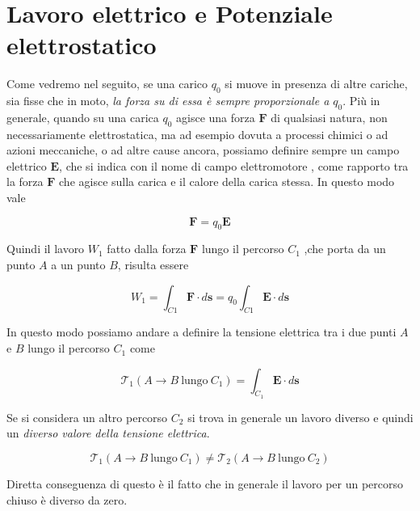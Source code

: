\chapter{Lavoro elettrico e Potenziale elettrostatico}

Come vedremo nel seguito, se una carico $q_0$ si muove in presenza di altre cariche, sia fisse che in moto, \emph{la forza su di essa è sempre proporzionale a $q_0$}. Più in generale, quando su una carica $q_0$ agisce una forza $\mathbf{F}$ di qualsiasi natura, non necessariamente elettrostatica, ma ad esempio dovuta a processi chimici o ad azioni meccaniche, o ad altre cause ancora, possiamo definire sempre un campo elettrico $\mathbf{E}$, che si indica con il nome di campo elettromotore , come rapporto tra la forza $\mathbf{F}$ che agisce sulla carica e il calore della carica stessa. In questo modo vale 

\begin{equation*}
    \mathbf{F} = q_0 \mathbf{E}
\end{equation*}

Quindi il lavoro $W_1$ fatto dalla forza $\mathbf{F}$ lungo il percorso $C_1$ ,che porta da un punto $A$ a un punto $B$, risulta essere 

\begin{equation}
    W_1 = \int_{C1} \mathbf{F} \cdot d\mathbf{s} = q_0 \int_{C1} \mathbf{E} \cdot d \mathbf{s} 
    \label{eq: lavoro con campo elettrico}
\end{equation}

In questo modo possiamo andare a definire la tensione elettrica  tra i due punti $A$ e $B$ lungo il percorso $C_1$ come

\begin{equation}
    \mathcal{T}_1(A \to B  \ \text{lungo} \ C_1) = \int_{C_1} \mathbf{E} \cdot d \mathbf{s}
\end{equation}

Se si considera un altro percorso $C_2$ si trova in generale un lavoro diverso e quindi un \emph{diverso valore della tensione elettrica}.

\begin{equation*}
    \mathcal{T}_1(A \to B  \ \text{lungo} \ C_1) \neq \mathcal{T}_2(A \to B  \ \text{lungo} \ C_2)
\end{equation*}

Diretta conseguenza di questo è il fatto che in generale il lavoro per un percorso chiuso è diverso da zero. 

